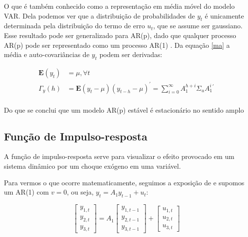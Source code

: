 \documentclass[a4paper,
               article,
               12pt,
               openany,
               oneside,
               english,
               brazil]{abntex2}
\numberwithin{equation}{section}
\begin{document}
    O que é também conhecido como a representação em média móvel do modelo VAR\@ \cite[18]{lutkepool}. Dela podemos ver que a distribuição de probabilidades de $ y_t $ é unicamente determinada pela distribuição do termo de erro $ u_t $, que se assume ser gaussiano. Esse resultado pode ser generalizado para AR(p), dado que qualquer processo AR(p) pode ser representado como um processo AR(1) \cite[p.~15]{lutkepool}. Da equação \eqref{ma} a média e auto-covariâncias de $ y_t $ podem ser derivadas: 

    \begin{align*}
        \label{momentos}
        \mathbf{E}(y_t) &= \mu, \forall t \\
        \Gamma_y (h) &= \mathbf{E}(y_t - \mu)(y_{t-h} - \mu)^{'} = \sum_{i=0}^{\infty} A_1^{h+i} \Sigma_u A_1^{i}^{'} \\
    \end{align*}

    Do que se conclui que um modelo AR(p) estável é estacionário no sentido amplo \cite[p.~15-16]{lutkepool}

    \subsection{Função de Impulso-resposta}

    A função de impulso-resposta serve para visualizar o efeito provocado em um sistema dinâmico por um choque exógeno em uma variável.

    Para vermos o que ocorre matematicamente, seguimos a exposição de \textcite[p.~51-53]{lutkepool} e supomos um AR(1) com $ v = 0 $, ou seja, $ y_t = A_1 y_{t-1} + u_t $:

    \begin{equation*}
        \begin{bmatrix}
            y_{1,t} \\
            y_{2,t} \\
            y_{3,t}
        \end{bmatrix} =
        A_1
        \begin{bmatrix}
            y_{1,t-1} \\
            y_{2,t-1} \\
            y_{3,t-1}
        \end{bmatrix} +
        \begin{bmatrix}
            u_{1,t} \\
            u_{2,t} \\
            u_{3,t}
        \end{bmatrix}
    \end{equation*}
\end{document}
